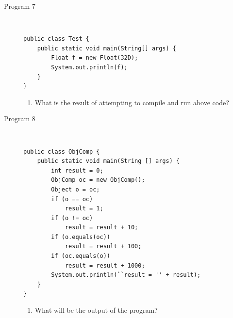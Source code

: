 \documentclass[11pt,a4paper]{article}
\def\AnswerBox{\fbox{\begin{minipage}{4in}\hfill\vspace{0.5in}\end{minipage}}}
\begin{document}
\begin{description}
\item [Program 7]\
\begin{lstlisting}
public class Test {
    public static void main(String[] args) {
        Float f = new Float(32D);    
        System.out.println(f);
    }
}
\end{lstlisting}

\AnswerBox

\begin{enumerate}[label=\bfseries Q\arabic*:]\itemsep10pt
        \item  What is the result of attempting to compile and run above code?
    \end{enumerate}

\item [Program 8] \
\begin{lstlisting}
public class ObjComp {
    public static void main(String [] args) {
        int result = 0;
        ObjComp oc = new ObjComp();
        Object o = oc;
        if (o == oc)  
            result = 1;
        if (o != oc)  
            result = result + 10;
        if (o.equals(oc))  
            result = result + 100;
        if (oc.equals(o))  
            result = result + 1000;
        System.out.println(``result = '' + result);
    }
}
\end{lstlisting}

\AnswerBox

\begin{enumerate}[label=\bfseries Q\arabic*:]\itemsep10pt
\item What will be the output of the program?
\end{enumerate}


\end{description}
\end{document}
